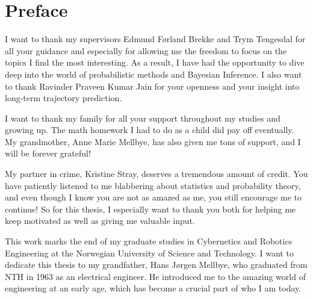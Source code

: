 \chapter*{Preface}

I want to thank my supervisors Edmund Førland Brekke and Trym Tengesdal for all your guidance and especially for allowing me the freedom to focus on the topics I find the most interesting. As a result, I have had the opportunity to dive deep into the world of probabilistic methods and Bayesian Inference. I also want to thank Ravinder Praveen Kumar Jain for your openness and your insight into long-term trajectory prediction.

I want to thank my family for all your support throughout my studies and growing up. The math homework I had to do as a child did pay off eventually. My grandmother, Anne Marie Mellbye, has also given me tons of support, and I will be forever grateful!   

My partner in crime, Kristine Stray, deserves a tremendous amount of credit. You have patiently listened to me blabbering about statistics and probability theory, and even though I know you are not as amazed as me, you still encourage me to continue! So for this thesis, I especially want to thank you both for helping me keep motivated as well as giving me valuable input. 


This work marks the end of my graduate studies in Cybernetics and Robotics Engineering at the Norwegian University of Science and Technology. I want to dedicate this thesis to my grandfather, Hans Jørgen Mellbye, who graduated from NTH in 1963 as an electrical engineer. He introduced me to the amazing world of engineering at an early age, which has become a crucial part of who I am today. 

